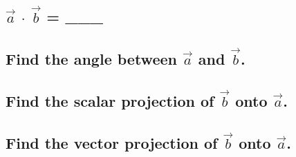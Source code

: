 \documentclass{article}
\begin{document}
\subsection{$\vec{a}$ $\cdot$ $\vec{b}$ = \_\_\_}
\vspace{3cm}
\subsection{Find the angle between $\vec{a}$ and $\vec{b}$.}
\vspace{3cm}
\subsection{Find the scalar projection of $\vec{b}$ onto $\vec{a}$.}
\vspace{3cm}
\subsection{Find the vector projection of $\vec{b}$ onto $\vec{a}$.}
\end{document}

